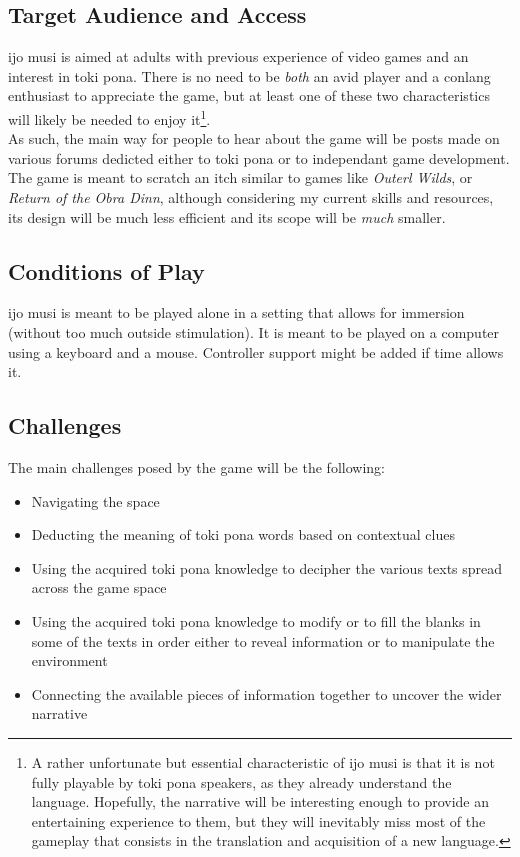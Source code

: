 \documentclass{scrartcl}
\begin{document}
		\subsection{Target Audience and Access}
			ijo musi is aimed at adults with previous experience of video games and an interest in toki pona. There is no need to be \textit{both} an avid player and a conlang enthusiast to appreciate the game, but at least one of these two characteristics will likely be needed to enjoy it\footnote{A rather unfortunate but essential characteristic of ijo musi is that it is not fully playable by toki pona speakers, as they already understand the language. Hopefully, the narrative will be interesting enough to provide an entertaining experience to them, but they will inevitably miss most of the gameplay that consists in the translation and acquisition of a new language.}.\\
			As such, the main way for people to hear about the game will be posts made on various forums dedicted either to toki pona or to independant game development.\\
			The game is meant to scratch an itch similar to games like \textit{Outerl Wilds}, or \textit{Return of the Obra Dinn}, although considering my current skills and resources, its design will be much less efficient and its scope will be \textit{much} smaller.
		\subsection{Conditions of Play}
			ijo musi is meant to be played alone in a setting that allows for immersion (without too much outside stimulation). It is meant to be played on a computer using a keyboard and a mouse. Controller support might be added if time allows it.  
		\subsection{Challenges}
			The main challenges posed by the game will be the following:
			\begin{itemize}
				\item Navigating the space
				\item Deducting the meaning of toki pona words based on contextual clues
				\item Using the acquired toki pona knowledge to decipher the various texts spread across the game space
				\item Using the acquired toki pona knowledge to modify or to fill the blanks in some of the texts in order either to reveal information or to manipulate the environment
				\item Connecting the available pieces of information together to uncover the wider narrative
			\end{itemize}
\end{document}

